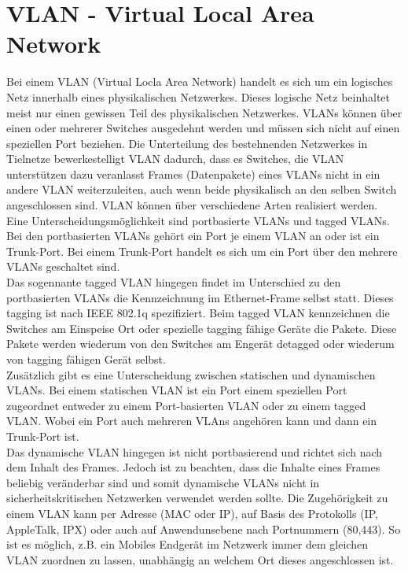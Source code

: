 \section{VLAN - Virtual Local Area Network}
\label{sec:vlan}

Bei einem VLAN (Virtual Locla Area Network) handelt es sich um ein logisches Netz innerhalb eines physikalischen Netzwerkes. Dieses logische Netz beinhaltet meist nur einen gewissen Teil des physikalischen Netzwerkes. VLANs können über einen oder mehrerer Switches ausgedehnt werden und müssen sich nicht auf einen speziellen Port beziehen. Die Unterteilung des bestehnenden Netzwerkes in Tielnetze bewerkestelligt VLAN dadurch, dass es Switches, die VLAN unterstützen dazu veranlasst Frames (Datenpakete) eines VLANs nicht in ein andere VLAN weiterzuleiten, auch wenn beide physikalisch an den selben Switch angeschlossen sind.
VLAN können über verschiedene Arten realisiert werden. Eine Unterscheidungsmöglichkeit sind portbasierte VLANs und tagged VLANs.
Bei den portbasierten VLANs gehört ein Port je einem VLAN an oder ist ein Trunk-Port. Bei einem Trunk-Port handelt es sich um ein Port über den mehrere VLANs geschaltet sind.\\
Das sogennante tagged VLAN hingegen findet im Unterschied zu den portbasierten VLANs die Kennzeichnung im Ethernet-Frame selbst statt. Dieses tagging ist nach IEEE 802.1q spezifiziert.
Beim tagged VLAN kennzeichnen die Switches am Einspeise Ort oder spezielle tagging fähige Geräte die Pakete. Diese Pakete werden wiederum von den Switches am Engerät detagged oder wiederum von tagging fähigen Gerät selbst.\\
Zusätzlich gibt es eine Unterscheidung zwischen statischen und dynamischen VLANs.
Bei einem statischen VLAN ist ein Port einem speziellen Port zugeordnet entweder zu einem Port-basierten VLAN oder zu einem tagged VLAN. Wobei ein Port auch mehreren VLAns angehören kann und dann ein Trunk-Port ist.\\
Das dynamische VLAN hingegen ist nicht portbasierend und richtet sich nach dem Inhalt des Frames. Jedoch ist zu beachten, dass die Inhalte eines Frames beliebig veränderbar sind und somit dynamische VLANs nicht in sicherheitskritischen Netzwerken verwendet werden sollte.
Die Zugehörigkeit zu einem VLAN kann per Adresse (MAC oder IP), auf Basis des Protokolls (IP, AppleTalk, IPX) oder auch auf Anwendunsebene nach Portnummern (80,443). So ist es möglich, z.B. ein Mobiles Endgerät im Netzwerk immer dem gleichen VLAN zuordnen zu lassen, unabhängig an welchem Ort dieses angeschlossen ist.\\
